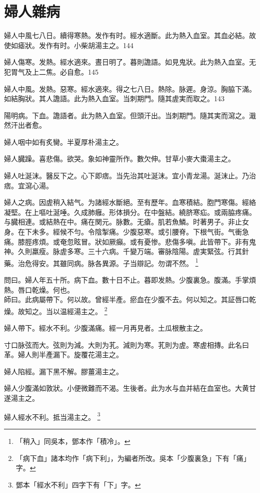 \chapter{婦人雜病}

婦人中風七八日。續得寒熱。发作有时。經水適斷。此为熱入血室。其血必結。故使如瘧狀。发作有时。小柴胡湯主之。144

婦人傷寒。发熱。經水適來。晝日明了。暮則譫語。如見鬼狀。此为熱入血室。无犯胃气及上二焦。必自愈。145

婦人中風。发熱。惡寒。經水適來。得之七八日。熱除。脉遲。身涼。胸脇下滿。如結胸狀。其人譫語。此为熱入血室。当刺期門。隨其{\khaaitp 虗}実而取之。143

陽明病。下血。譫語者。此为熱入血室。但頭汗出。当刺期門。隨其実而瀉之。濈然汗出者愈。

婦人咽中如有炙臠。半夏厚朴湯主之。

婦人臓躁。喜悲傷。欲哭。象如神靈所作。數欠伸。甘草小麥大棗湯主之。

婦人吐涎沫。醫反下之。心下即痞。当先治其吐涎沫。宜小青龙湯。涎沫止。乃治痞。宜瀉心湯。

婦人之病。因虗稍入結气。为諸經水斷絕。至有歷年。血寒積結。胞門寒傷。經絡凝堅。在上嘔吐涎唾。久成肺癰。形体損分。在中盤結。繞脐寒疝。或兩脇疼痛。与臓相連。或結熱在中。痛在関元。脉數。无瘡。肌若魚鱗。时著男子。非止女身。在下未多。經候不勻。令陰掣痛。少腹惡寒。或引腰脊。下根气街。气衝急痛。膝脛疼煩。或奄忽眩冒。狀如厥癲。或有憂惨。悲傷多嗔。此皆帶下。非有鬼神。久則羸瘦。脉虗多寒。三十六病。千變万端。審脉陰陽。虗実緊弦。行其針藥。治危得安。其雖同病。脉各異源。子当辯記。勿谓不然。
	\footnote{「稍入」同吳本，鄧本作「積冷」。}

問曰。婦人年五十所。病下血。數十日不止。暮即发熱。少腹裏急。腹滿。手掌煩熱。唇口乾燥。何也。\\
師曰。此病屬帶下。何以故。曾經半產。瘀血在少腹不去。何以知之。其証唇口乾燥。故知之。当以温經湯主之。
	\footnote{「病下血」諸本均作「病下利」，为編者所改。吳本「少腹裏急」下有「痛」字。}

{\khaaitp 婦人}帶下。經水不利。少腹滿痛。經一月再見者。土瓜根散主之。

寸口脉弦而大。弦則为減。大則为芤。減則为寒。芤則为虗。寒虗相摶。此名曰革。婦人則半產漏下。旋覆花湯主之。

婦人陷經。漏下黑不解。膠薑湯主之。

婦人少腹滿如敦狀。小便微難而不渴。生後者。此为水与血并結在血室也。大黄甘遂湯主之。

婦人經水不利。抵当湯主之。
	\footnote{鄧本「經水不利」四字下有「下」字。}

